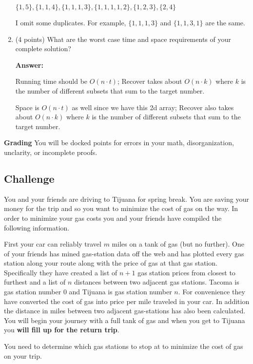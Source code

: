 \documentclass[paper=a4, fontsize=11pt]{scrartcl}
\numberwithin{equation}{section}		%
\numberwithin{figure}{section}			%
\numberwithin{table}{section}				%
\begin{document}
\begin{enumerate}
$\{1,5\}, \{1,1,4\}, \{1,1,1,3\}, \{1,1,1,1,2\}, \{1,2,3\}, \{2,4\}$

I omit some duplicates. For example, $\{1,1,1,3\}$ and $\{1,1,3,1\}$ are the same.

\item (4 points) What are the worst case time and space requirements of your complete solution?

\textbf{Answer:}

Running time should be $O(n\cdot t)$; Recover takes about $O(n\cdot k)$ where $k$ is the number of different subsets that sum to the target number.

Space is $O(n\cdot t)$ as well since we have this 2d array; Recover also takes about $O(n\cdot k)$ where $k$ is the number of different subsets that sum to the target number.


\end{enumerate}

\noindent\textbf{Grading} You will be docked points for errors in your math, disorganization, unclarity, or incomplete proofs. 

\subsection{Challenge}

You and your friends are driving to Tijuana for spring break.  You are saving your money for the trip and so you want to minimize the cost of gas on the way.  In order to minimize your gas costs you and your friends have compiled the following information.  

First your car can reliably travel $m$ miles on a tank of gas (but no further).  One of your friends has mined gas-station data off the web and has plotted every gas station along your route along with the price of gas at that gas station.  Specifically they have created a list of $n + 1$ gas station prices from closest to furthest and a list of $n$ distances between two adjacent gas stations.  Tacoma is gas station number $0$ and Tijuana is gas station number $n$.  For convenience they have converted the cost of gas into price per mile traveled in your car.  
In addition the distance in miles between two adjacent gas-stations has also been calculated.  You will begin your journey with a full tank of gas and when you get to Tijuana you \textbf{will fill up for the return trip}.

You need to determine which gas stations to stop at to minimize the cost of gas on your trip.
\end{document}
